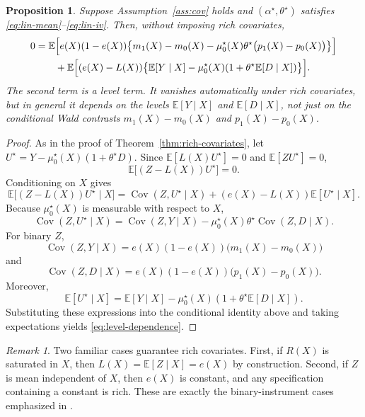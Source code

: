 \documentclass[11pt]{article}
\numberwithin{equation}{section}
\newcommand{\E}{\mathbb E}
\newcommand{\1}{\mathbf 1}
\DeclareMathOperator{\Cov}{Cov}
\newtheorem{proposition}[assumption]{Proposition}
\theoremstyle{remark}
\newtheorem{remark}[assumption]{Remark}
\begin{document}
\begin{proposition}\label{prop:level-dependence}
Suppose Assumption~\ref{ass:cov} holds and $(\alpha^\star,\theta^\star)$ satisfies
\eqref{eq:lin-mean}--\eqref{eq:lin-iv}. Then, without imposing rich covariates,
\begin{align}
0
&= \E\Bigl[e(X)(1-e(X))\bigl\{m_1(X)-m_0(X)-\mu_0^\star(X)\theta^\star
\bigl(p_1(X)-p_0(X)\bigr)\bigr\}\Bigr] \notag\\
&\qquad
+ \E\Bigl[(e(X)-L(X))\bigl\{\E[Y\mid X]-\mu_0^\star(X)(1+\theta^\star\E[D\mid X])\bigr\}\Bigr].
\label{eq:level-dependence}
\end{align}
The second term is a level term. It vanishes automatically under rich covariates, but in
general it depends on the levels $\E[Y\mid X]$ and $\E[D\mid X]$, not just on the
conditional Wald contrasts $m_1(X)-m_0(X)$ and $p_1(X)-p_0(X)$.
\end{proposition}

\begin{proof}
As in the proof of Theorem~\ref{thm:rich-covariates}, let
$U^\star=Y-\mu_0^\star(X)(1+\theta^\star D)$. Since
$\E[L(X)U^\star]=0$ and $\E[ZU^\star]=0$,
\[
\E\bigl[(Z-L(X))U^\star\bigr] = 0.
\]
Conditioning on $X$ gives
\[
\E\bigl[(Z-L(X))U^\star\mid X\bigr]
= \Cov(Z,U^\star\mid X) + (e(X)-L(X))\E[U^\star\mid X].
\]
Because $\mu_0^\star(X)$ is measurable with respect to $X$,
\[
\Cov(Z,U^\star\mid X)
= \Cov(Z,Y\mid X) - \mu_0^\star(X)\theta^\star\Cov(Z,D\mid X).
\]
For binary $Z$,
\[
\Cov(Z,Y\mid X) = e(X)(1-e(X))\bigl(m_1(X)-m_0(X)\bigr)
\]
and
\[
\Cov(Z,D\mid X) = e(X)(1-e(X))\bigl(p_1(X)-p_0(X)\bigr).
\]
Moreover,
\[
\E[U^\star\mid X]
= \E[Y\mid X]-\mu_0^\star(X)(1+\theta^\star\E[D\mid X]).
\]
Substituting these expressions into the conditional identity above and taking
expectations yields \eqref{eq:level-dependence}.
\end{proof}

\begin{remark}\label{rem:rich-examples}
Two familiar cases guarantee rich covariates. First, if $R(X)$ is saturated in $X$,
then $L(X)=\E[Z\mid X]=e(X)$ by construction. Second, if $Z$ is mean independent of
$X$, then $e(X)$ is constant, and any specification containing a constant is rich. These
are exactly the binary-instrument cases emphasized in \cite{blandhol2022tsls}.
\end{remark}



\end{document}
